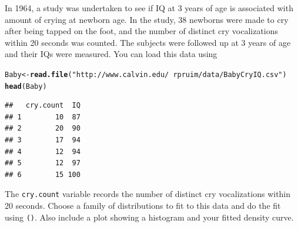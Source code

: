 \documentclass[twoside]{book}\usepackage[]{graphicx}\usepackage[]{xcolor}
\makeatletter
\newcommand{\hlstr}[1]{\textcolor[rgb]{0.192,0.494,0.8}{#1}}%
\newcommand{\hlstd}[1]{\textcolor[rgb]{0.345,0.345,0.345}{#1}}%
\newcommand{\hlkwb}[1]{\textcolor[rgb]{0.69,0.353,0.396}{#1}}%
\newcommand{\hlkwd}[1]{\textcolor[rgb]{0.737,0.353,0.396}{\textbf{#1}}}%
\newenvironment{kframe}{%
 \def\at@end@of@kframe{}%
 \ifinner\ifhmode%
  \def\at@end@of@kframe{\end{minipage}}%
  \begin{minipage}{\columnwidth}%
 \fi\fi%
 \def\FrameCommand##1{\hskip\@totalleftmargin \hskip-\fboxsep
 \colorbox{shadecolor}{##1}\hskip-\fboxsep
     \hskip-\linewidth \hskip-\@totalleftmargin \hskip\columnwidth}%
 \MakeFramed {\advance\hsize-\width
   \@totalleftmargin\z@ \linewidth\hsize
   \@setminipage}}%
 {\par\unskip\endMakeFramed%
 \at@end@of@kframe}
\newenvironment{knitrout}{}{} %
\newcommand{\variable}[1]{{\color{green!50!black}\texttt{#1}}}
\newcommand{\Rindex}[1]{\index{\texttt{#1}}}
\newcommand{\dataframe}[1]{{\color{blue!80!black}\texttt{#1}}\Rindex{#1}}
\newcommand{\function}[1]{{\color{purple!75!blue}\texttt{\StrSubstitute{#1}{()}{}()}}\Rindex{#1}}
\makeatother
\begin{document}
\begin{problem}
	In 1964, a study was undertaken to see if IQ at 3 years of age is
	associated with amount of crying at newborn age. In the study, 38 newborns
	were made to cry after being tapped on the foot, and the number of distinct
	cry vocalizations within 20 seconds was counted.
	The subjects were followed up at 3 years of age and their IQs were measured.
	You can load this data using
\begin{knitrout}
\color{fgcolor}\begin{kframe}
\begin{alltt}
\hlstd{Baby} \hlkwb{<-} \hlkwd{read.file}\hlstd{(}\hlstr{"http://www.calvin.edu/~rpruim/data/BabyCryIQ.csv"}\hlstd{)}
\hlkwd{head}\hlstd{(Baby)}
\end{alltt}
\begin{verbatim}
##   cry.count  IQ
## 1        10  87
## 2        20  90
## 3        17  94
## 4        12  94
## 5        12  97
## 6        15 100
\end{verbatim}
\end{kframe}
\end{knitrout}

	The \variable{cry.count} variable records the number of distinct cry vocalizations 
	within 20 seconds.  Choose a family of distributions to fit to this data
	and do the fit using \function{fitdistr()}. Also include a plot showing 
	a histogram and your fitted density curve.
\end{problem}
\end{document}
